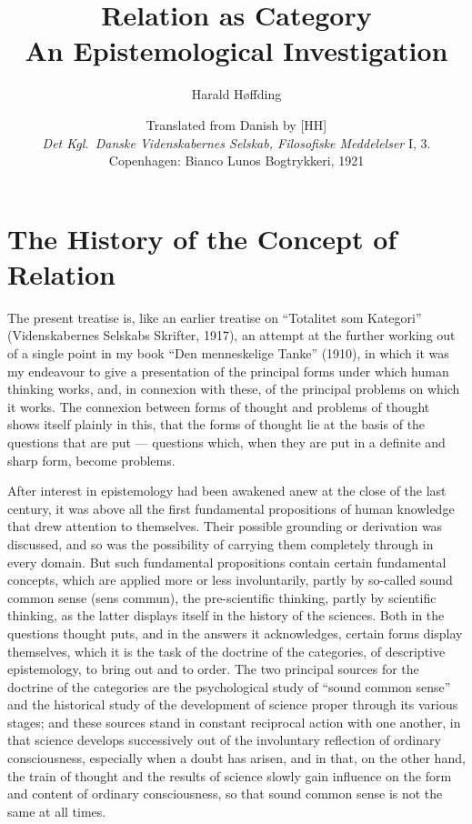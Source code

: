 \documentclass[12pt]{article}
\title{\textbf{Relation as Category}\\[0.5em]
  \large An Epistemological Investigation}
\author{Harald Høffding}
\date{Translated from Danish by [HH]\\[0.4em]
  \textit{Det Kgl.\ Danske Videnskabernes Selskab,
  Filosofiske Meddelelser} I, 3.\\
  Copenhagen: Bianco Lunos Bogtrykkeri, 1921}
\newcommand{\opage}[1]{\marginnote{\footnotesize\textit{[#1]}}}
\begin{document}
\maketitle
\tableofcontents
\bigskip



\section{The History of the Concept of Relation}
\label{sec:1}

\noindent \opage{3}The present treatise is, like an earlier treatise on ``Totalitet
som Kategori'' (Videnskabernes Selskabs Skrifter, 1917), an attempt at the
further working out of a single point in my book ``Den menneskelige Tanke''
(1910), in which it was my endeavour to give a presentation of the principal
forms under which human thinking works, and, in connexion with these, of the
principal problems on which it works. The connexion between forms of thought
and problems of thought shows itself plainly in this, that the forms of
thought lie at the basis of the questions that are put --- questions which,
when they are put in a definite and sharp form, become problems.

After interest in epistemology had been awakened anew at the close of the
last century, it was above all the first fundamental propositions of human
knowledge that drew attention to themselves. Their possible grounding or
derivation was discussed, and so was the possibility of carrying them
completely through in every domain. But such fundamental propositions
contain certain fundamental concepts, which are applied more or less
involuntarily, partly by so-called sound common sense (sens commun), the
pre-scientific thinking, partly by scientific thinking, as the latter
displays itself in the history of the sciences. Both in the questions
thought puts, and in \opage{4}the answers it acknowledges, certain forms display
themselves, which it is the task of the doctrine of the categories, of
descriptive epistemology, to bring out and to order. The two principal
sources for the doctrine of the categories are the psychological study of
``sound common sense'' and the historical study of the development of
science proper through its various stages; and these sources stand in
constant reciprocal action with one another, in that science develops
successively out of the involuntary reflection of ordinary consciousness,
especially when a doubt has arisen, and in that, on the other hand, the
train of thought and the results of science slowly gain influence on the
form and content of ordinary consciousness, so that sound common sense is
not the same at all times.
\end{document}
